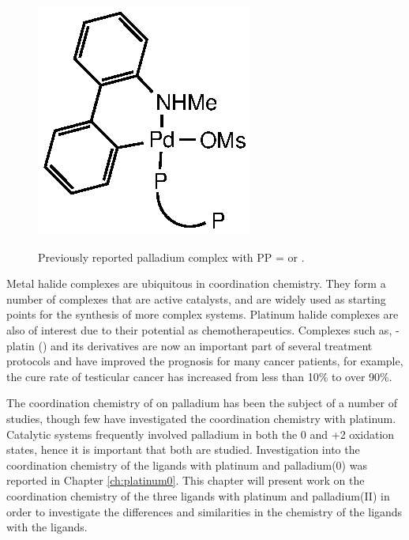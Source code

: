 \begin{figure}[htbp]
\begin{center}
\vspace{0.5cm}
\includegraphics{../Figures/Pdmetallacycle.eps}
\caption[Previously reported palladium complex of \tBuxantphos{} and \Phxantphos{}]{Previously reported palladium complex with PP = \tBuxantphos{} or \Phxantphos{}.\cite{Friis2014}}
\vspace{0.2cm}
\label{Pdmetallacycle}
\end{center}
\end{figure}
\vspace{0.2cm}	

Metal halide complexes are ubiquitous in coordination chemistry.  They form a number of complexes that are active catalysts, and are widely used as starting points for the synthesis of more complex systems.  Platinum halide complexes are also of interest due to their potential as chemotherapeutics.  Complexes such as, \cis{}-platin (\ce{[PtCl2(NH3)2]}) and its derivatives are now an important part of  several treatment protocols and have improved the prognosis for many cancer patients, for example, the cure rate of testicular cancer has increased from less than 10\%{} to over 90\%.\cite{Wilson2013}

The coordination chemistry of \Phxantphos{} on palladium has been the subject of a number of studies, though few have investigated the coordination chemistry with platinum.\cite{Zuideveld2002, Raebiger2004, Bakhmutov2012, Miedaner2004, Klingensmith2006, Petocz2004, Yin2002}  Catalytic systems frequently involved palladium in both the 0 and +2 oxidation states, hence it is important that both are studied.\cite{Tsuji1995}  Investigation into the coordination chemistry of the \tBuxantphos{} ligands with platinum and palladium(0) was reported in Chapter \ref{ch:platinum0}.  This chapter will present work on the coordination chemistry of the three \tBuxantphos{} ligands with platinum and palladium(II) in order to investigate the differences and similarities in the chemistry of the \tBuxantphos{} ligands with the \Phxantphos{} ligands.  

